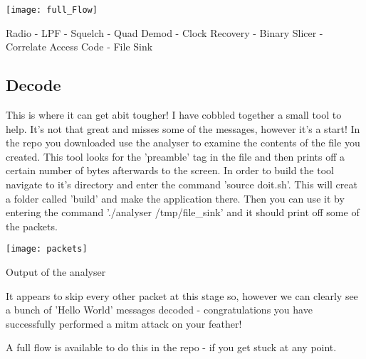 \centrefigurestart
\texttt{[image: full\_Flow]}
\caption{Radio - LPF - Squelch - Quad Demod - Clock Recovery - Binary Slicer - Correlate Access Code - File Sink}
\centrefigureend
\subsection{Decode}
This is where it can get abit tougher! I have cobbled together a small tool to help. It's not that great and misses some of the messages, however it's a start! In the repo you downloaded use the analyser to examine the contents of the file you created. This tool looks for the 'preamble' tag in the file and then prints off a certain number of bytes afterwards to the screen. In order to build the tool navigate to it's directory and enter the command 'source doit.sh'. This will creat a folder called 'build' and make the application there. Then you can use it by entering the command './analyser /tmp/file\_sink' and it should print off some of the packets.

\centrefigurestart
\texttt{[image: packets]}
\caption{Output of the analyser}
\centrefigureend

It appears to skip every other packet at this stage so, however we can clearly see a bunch of 'Hello World' messages decoded - congratulations you have successfully performed a \gls{mitm} attack on your feather!

A full flow is available to do this in the repo - if you get stuck at any point.
